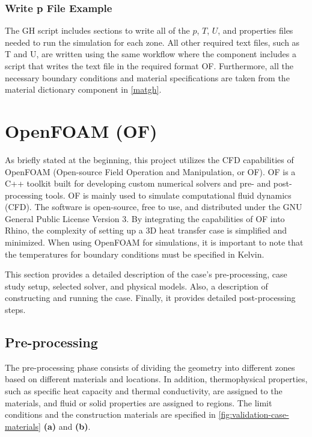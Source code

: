 \subsubsection{Write p File Example}
The \gls{GH} script includes sections to write all of the $p$, $T$, $U$, and properties files needed to run the simulation for each zone. All other required text files, such as T and U, are written using the same workflow where the component includes a script that writes the text file in the required format \gls{OF}. Furthermore, all the necessary boundary conditions and material specifications are taken from the material dictionary component in \cref{matgh}.


















\section[OpenFOAM]{OpenFOAM (OF)}
As briefly stated at the beginning, this project utilizes the CFD capabilities of OpenFOAM (Open-source Field Operation and Manipulation, or OF).  \gls{OF} is a C++ toolkit built for developing custom numerical solvers and pre- and post-processing tools. \gls{OF} is mainly used to simulate computational fluid dynamics (CFD). The software is open-source, free to use, and distributed under the GNU General Public License Version 3.
By integrating the capabilities of \gls{OF} into Rhino, the complexity of setting up a 3D heat transfer case is simplified and minimized. When using OpenFOAM for simulations, it is important to note that the temperatures for boundary conditions must be specified in Kelvin.

This section provides a detailed description of the case's pre-processing, case study setup, selected solver, and physical models. Also, a description of constructing and running the case. Finally, it provides detailed post-processing steps.



\subsection{Pre-processing}
The pre-processing phase consists of dividing the geometry into different zones based on different materials and locations. In addition, thermophysical properties, such as specific heat capacity and thermal conductivity, are assigned to the materials, and fluid or solid properties are assigned to regions. The limit conditions and the construction materials are specified in \cref{fig:validation-case-materials} \textbf{(a)} and \textbf{(b)}. 


